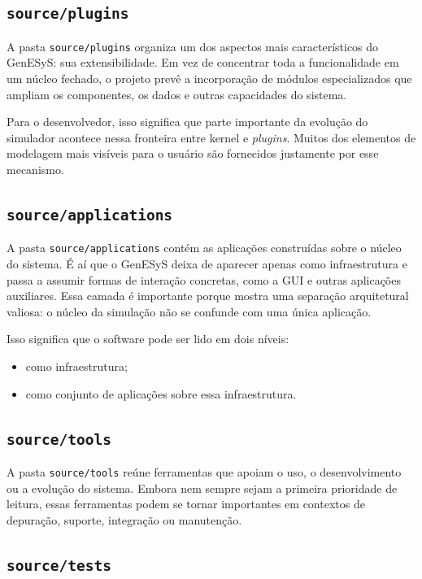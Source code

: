 \subsection{\texttt{source/plugins}}
\label{subsec:cap6_source_plugins}

A pasta \texttt{source/plugins} organiza um dos aspectos mais característicos do GenESyS: sua extensibilidade. Em vez de concentrar toda a funcionalidade em um núcleo fechado, o projeto prevê a incorporação de módulos especializados que ampliam os componentes, os dados e outras capacidades do sistema.

Para o desenvolvedor, isso significa que parte importante da evolução do simulador acontece nessa fronteira entre kernel e \textit{plugins}. Muitos dos elementos de modelagem mais visíveis para o usuário são fornecidos justamente por esse mecanismo.

\subsection{\texttt{source/applications}}
\label{subsec:cap6_source_applications}

A pasta \texttt{source/applications} contém as aplicações construídas sobre o núcleo do sistema. É aí que o GenESyS deixa de aparecer apenas como infraestrutura e passa a assumir formas de interação concretas, como a GUI e outras aplicações auxiliares. Essa camada é importante porque mostra uma separação arquitetural valiosa: o núcleo da simulação não se confunde com uma única aplicação.

Isso significa que o software pode ser lido em dois níveis:
\begin{itemize}
    \item como infraestrutura;
    \item como conjunto de aplicações sobre essa infraestrutura.
\end{itemize}

\subsection{\texttt{source/tools}}
\label{subsec:cap6_source_tools}

A pasta \texttt{source/tools} reúne ferramentas que apoiam o uso, o desenvolvimento ou a evolução do sistema. Embora nem sempre sejam a primeira prioridade de leitura, essas ferramentas podem se tornar importantes em contextos de depuração, suporte, integração ou manutenção.

\subsection{\texttt{source/tests}}
\label{subsec:cap6_source_tests}

